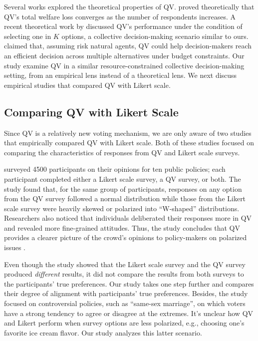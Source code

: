 Several works explored the theoretical properties of QV. \textcite{lalley2018quadratic} proved theoretically that QV's total welfare loss converges as the number of respondents increases. A recent theoretical work by \textcite{eguia2019quadratic} discussed QV's performance under the condition of selecting one in $K$ options, a collective decision-making scenario similar to ours. \textcite{eguia2019quadratic} claimed that, assuming risk natural agents, QV could help decision-makers reach an efficient decision across multiple alternatives under budget constraints. Our study examine QV in a similar resource-constrained collective decision-making setting, from an empirical lens instead of a theoretical lens. We next discuss empirical studies that compared QV with Likert scale.

\subsection{Comparing QV with Likert Scale}
Since QV is a relatively new voting mechanism, we are only aware of two studies that empirically compared QV with Likert scale. Both of these studies focused on comparing the characteristics of responses from QV and Likert scale surveys.

\textcite{quarfoot2017quadratic} surveyed 4500 participants on their opinions for ten public policies; each participant completed either a Likert scale survey, a QV survey, or both.  The study found that, for the same group of participants, responses on any option from the QV survey followed a normal distribution while those from the Likert scale survey were heavily skewed or polarized into ``W-shaped'' distributions. Researchers also noticed that individuals deliberated their responses more in QV and revealed more fine-grained attitudes. Thus, the study concludes that QV provides a clearer picture of the crowd's opinions to policy-makers on polarized issues \cite{quarfoot2017quadratic}. 

Even though the study showed that the Likert scale survey and the QV survey produced \textit{different} results, it did not compare the results from both surveys to the participants' true preferences. Our study takes one step further and compares their degree of alignment with participants' true preferences. Besides, the study focused on controversial policies, such as ``same-sex marriage'', on which voters have a strong tendency to agree or disagree at the extremes. It's unclear how QV and Likert perform when survey options are less polarized, e.g., choosing one's favorite ice cream flavor. Our study analyzes this latter scenario.

